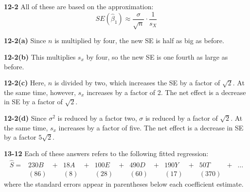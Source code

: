 \documentclass[addpoints,12pt]{exam}\usepackage[]{graphicx}\usepackage[]{color}
\begin{document}
\begin{questions}
  \item[]
    \begin{solution} \textbf{12-2}
    All of these are based on the approximation:
      $$SE(\widehat{\beta}_1) \approx \frac{\sigma}{\sqrt{n}} \cdot \frac{1}{s_X}$$
    \end{solution}
    \begin{parts}
      \item[]
      \begin{solution} \textbf{12-2(a)} Since $n$ is multiplied by four, the new SE is half as big as before. \end{solution}
      \item[]
      \begin{solution} \textbf{12-2(b)} This multiplies $s_x$ by four, so the new SE is one fourth as large as before. \end{solution}
      \item[]
      \begin{solution} \textbf{12-2(c)} Here, $n$ is divided by two, which increases the SE by a factor of $\sqrt{2}$. At the same time, however, $s_x$ increases by a factor of 2. The net effect is a decrease in SE by a factor of $\sqrt{2}$.
      \end{solution}
      \item[]
      \begin{solution} \textbf{12-2(d)} Since $\sigma^2$ is reduced by a factor two, $\sigma$ is reduced by a factor of $\sqrt{2}$. At the same time, $s_x$ increases by a factor of five. The net effect is a decrease in SE by a factor $5\sqrt{2}.$ \end{solution}
    \end{parts}
      \item[]
        \begin{solution} \textbf{13-12}
        Each of these answers refers to the following fitted regression:
          $$\begin{array}{cccccccccccccc}\widehat{S} = & 230 B& + &18A &+ &100 E& + &490 D& + &190 Y& + &50T & + & \hdots \\
          &(86)&&(8)&&(28)&&(60)&&(17)&&(370)
          \end{array}
          $$
          where the standard errors appear in parentheses below each coefficient estimate.
        \end{solution}
    \begin{parts}
      \item[]

\end{parts}
\end{questions}
\end{document}
